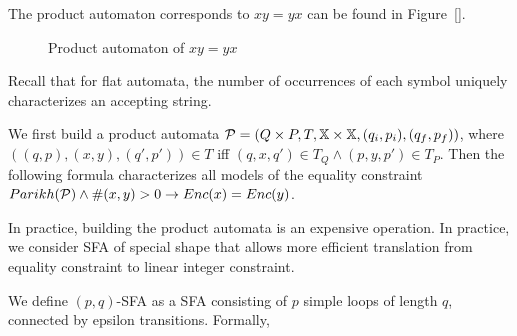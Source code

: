 \documentclass{llncs}
\begin{document}
The product automaton corresponds to $xy=yx$ can be found in Figure~\ref{}. 



\begin{figure}

	\begin{minipage}[t]{0.28\textwidth}
	\end{minipage}
	
	\caption{Product automaton of $xy=yx$}
	\label{fig:sfa}
\end{figure}




Recall that for flat automata, the number of occurrences of each symbol uniquely characterizes an accepting string. 






We first build a product automata $\mathcal{P}=(Q\times P, T, \mbox{$\mathbb{X}$}\times \mbox{$\mathbb{X}$}, (q_i,p_i), (q_f,p_f))$, where $((q,p),(x,y), (q',p'))\in T$ iff $(q,x,q')\in T_Q \wedge (p,y,p')\in T_P$. Then the following formula characterizes all models of the equality constraint $Parikh(\mathcal{P}) \wedge \#(x,y) > 0 \rightarrow Enc(x) = Enc(y)$.

In practice, building the product automata is an expensive operation. In practice, we consider SFA of special shape that allows more efficient translation from equality constraint to linear integer constraint.

We define $(p,q)$-SFA as a SFA consisting of $p$ simple loops of length $q$, connected by epsilon transitions. Formally, 
\end{document}
